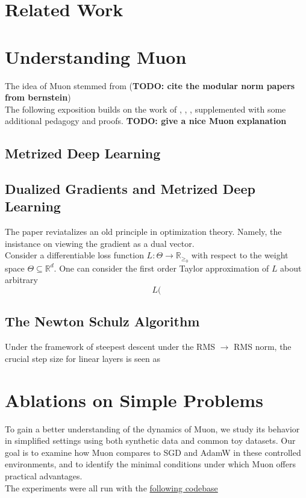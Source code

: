 \documentclass[12pt]{book}
\newcommand{\R}{\mathbb{R}}
\newcommand{\todo}[1]{{\color{red}\bf{TODO: #1}}}
\begin{document}
\section{Related Work}
\section{Understanding Muon}
The idea of Muon stemmed from (\todo{cite the modular norm papers from bernstein})
\\
The following exposition builds on the work of \cite{bernstein2024modulardualitydeeplearning}, \cite{bernstein2025deriving}, \cite{jordan2024muon}, \cite{pethick2025trainingdeeplearningmodels} supplemented with some additional pedagogy and proofs.
\todo{give a nice Muon explanation}
\\

\subsection{Metrized Deep Learning}

\subsection{Dualized Gradients and Metrized Deep Learning}
The paper \cite{bernstein2024modulardualitydeeplearning} reviatalizes an old principle in optimization theory. Namely, the insistance on viewing the gradient as a dual vector. \\
Consider a differentiable loss function $L:\Theta \to \R_{\ge_0}$ with respect to the weight space $\Theta \subseteq \R^{d}$. One can consider the first order Taylor approximation of $L$ about arbitrary
\[
 L(
\] 
\subsection{The Newton Schulz Algorithm}
Under the framework of steepest descent under the RMS $\to$ RMS norm, the crucial step size for linear layers is seen as 


\section{Ablations on Simple Problems}
To gain a better understanding of the dynamics of Muon, we study its behavior in simplified settings using both synthetic data and common toy datasets. Our goal is to examine how Muon compares to SGD and AdamW in these controlled environments, and to identify the minimal conditions under which Muon offers practical advantages.
\\
The experiments were all run with the \href{https://github.com/sam-laing/optimizer_playground/tree/main}{following codebase}
\end{document}
